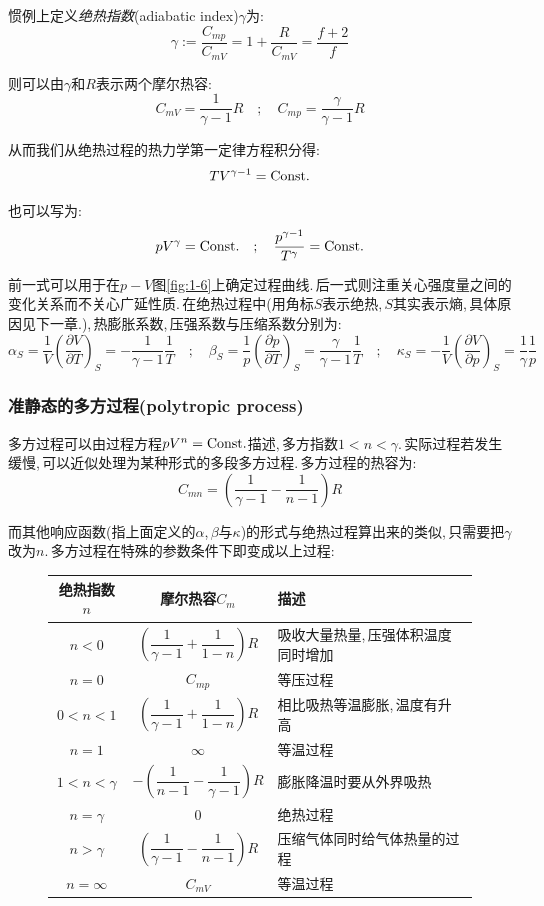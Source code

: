 惯例上定义\emph{绝热指数}(adiabatic index)$\gamma$为:
\[\gamma:=\frac{C_{mp}}{C_{mV}}=1+\frac{R}{C_{mV}}=\frac{f+2}{f}\]

则可以由$\gamma$和$R$表示两个摩尔热容:
\[C_{mV}=\frac{1}{\gamma -1}R \quad ;\quad C_{mp}=\frac{\gamma}{\gamma -1}R\]

从而我们从绝热过程的热力学第一定律方程积分得:
\[TV^{\gamma-1}={\rm Const.}\]

也可以写为:
\[pV^\gamma={\rm Const.} \quad ; \quad \frac{p^{\gamma-1}}{T^\gamma}={\rm Const.}\]

前一式可以用于在$p-V$图\ref{fig:1-6}上确定过程曲线.\,后一式则注重关心强度量之间的变化关系而不关心广延性质.\,在绝热过程中(用角标$S$表示绝热,\,$S$其实表示熵,\,具体原因见下一章.),\,热膨胀系数,\,压强系数与压缩系数分别为:
\[\alpha_S=\frac{1}{V}\left(\frac{\partial V}{\partial T}\right)_S=-\frac{1}{\gamma -1}\frac{1}{T} \quad ;\quad \beta_S=\frac{1}{p}\left(\frac{\partial p}{\partial T}\right)_S=\frac{\gamma}{\gamma -1}\frac{1}{T}\quad ;\quad \kappa_S=-\frac{1}{V}\left(\frac{\partial V}{\partial p}\right)_S=\frac{1}{\gamma}\frac{1}{p}\]

\subsubsection{\hei 准静态的多方过程(polytropic process)}
多方过程可以由过程方程$pV^n={\rm Const.}$描述,\,多方指数$1<n<\gamma$.\,实际过程若发生缓慢,\,可以近似处理为某种形式的多段多方过程.\,多方过程的热容为:
\[C_{mn}=\left(\frac{1}{\gamma -1}-\frac{1}{n-1}\right)R\]

而其他响应函数(指上面定义的$\alpha$,\,$\beta$与$\kappa$)的形式与绝热过程算出来的类似,\,只需要把$\gamma$改为$n$.\,多方过程在特殊的参数条件下即变成以上过程:
\begin{figure}[H]
\centering
\begin{tabular}{c|c|l}
\hline
绝热指数$n$		&	摩尔热容$C_m$						&	描述			\\ \hline\hline
$n<0$ 			   		&	$\left(\dfrac{1}{\gamma -1}+\dfrac{1}{1-n}\right)R$ 		&	 吸收大量热量,\,压强体积温度同时增加			\\ \hline
$n=0$				  &	$C_{mp}$    																				&   等压过程 		    \\ \hline
$0<n<1$			&   $\left(\dfrac{1}{\gamma -1}+\dfrac{1}{1-n}\right)R$ 				&   相比吸热等温膨胀,\,温度有升高				\\ \hline
$n=1$		&	$\infty$ 																									&  	等温过程 			\\ \hline
$1<n<\gamma$		&	$ -\left(\dfrac{1}{n -1}-\dfrac{1}{\gamma -1}\right)R$ 				& 	膨胀降温时要从外界吸热 			\\ \hline
$n=\gamma$		&	$0$ 																									&	绝热过程 			\\ \hline
$n>\gamma$		&	$\left(\dfrac{1}{\gamma -1}-\dfrac{1}{n-1}\right)R$						& 	压缩气体同时给气体热量的过程	\\ \hline
$n=\infty$		&	$C_{mV}$ 																						&	等温过程			\\ \hline
\end{tabular}
\end{figure}

